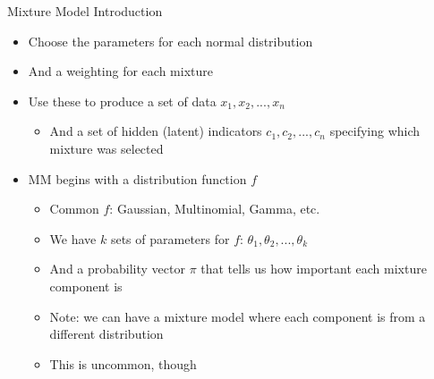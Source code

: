 \documentclass[aspectratio=169]{beamer}
\begin{document}
\begin{frame}{Mixture Model Introduction}

\begin{itemize}
	\item Choose the parameters for each normal distribution
	\item And a weighting for each mixture
	\item Use these to produce a set of data $x_1, x_2, ..., x_n$
        \begin{itemize}
		\item And a set of hidden (latent) indicators $c_1, c_2, ..., c_n$ specifying which mixture was selected
	\end{itemize}
	\item MM begins with a distribution function $f$
       	\begin{itemize}
		\item Common $f$: Gaussian, Multinomial, Gamma, etc.
		\item We have $k$ sets of parameters for $f$: $\theta_1, \theta_2, ..., \theta_k$
		\item And a probability vector $\pi$ that tells us how important each mixture component is	
		\item Note: we can have a mixture model where each component is from a different distribution
		\item This is uncommon, though
	\end{itemize}
\end{itemize}
\end{frame}
\end{document}
